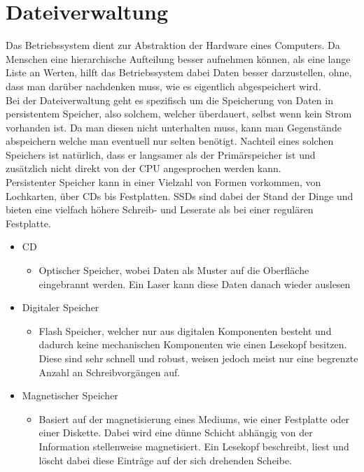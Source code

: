 \documentclass{article}
\begin{document}
	\section{Dateiverwaltung}
	Das Betriebssystem dient zur Abstraktion der Hardware eines Computers. Da Menschen eine hierarchische Aufteilung besser aufnehmen können, als eine lange Liste an Werten, hilft das Betriebssystem dabei Daten besser darzustellen, ohne, dass man darüber nachdenken muss, wie es eigentlich abgespeichert wird. \\
	Bei der Dateiverwaltung geht es spezifisch um die Speicherung von Daten in persistentem Speicher, also solchem, welcher überdauert, selbst wenn kein Strom vorhanden ist. Da man diesen nicht unterhalten muss, kann man Gegenstände abspeichern welche man eventuell nur selten benötigt. Nachteil eines solchen Speichers ist natürlich, dass er langsamer als der Primärspeicher ist und zusätzlich nicht direkt von der CPU angesprochen werden kann. \\
	Persistenter Speicher kann in einer Vielzahl von Formen vorkommen, von Lochkarten, über CDs bis Festplatten. SSDs sind dabei der Stand der Dinge und bieten eine vielfach höhere Schreib- und Leserate als bei einer regulären Festplatte. \\
	\begin{itemize}
		\item{CD}
		\begin{itemize}
			\item{Optischer Speicher, wobei Daten als Muster auf die Oberfläche eingebrannt werden. Ein Laser kann diese Daten danach wieder auslesen}
		\end{itemize}
		\item{Digitaler Speicher}
		\begin{itemize}
			\item{Flash Speicher, welcher nur aus digitalen Komponenten besteht und dadurch keine mechanischen Komponenten wie einen Lesekopf besitzen. Diese sind sehr schnell und robust, weisen jedoch meist nur eine begrenzte Anzahl an Schreibvorgängen auf.}
		\end{itemize}
		\item{Magnetischer Speicher}
		\begin{itemize}
			\item{Basiert auf der magnetisierung eines Mediums, wie einer Festplatte oder einer Diskette. Dabei wird eine dünne Schicht abhängig von der Information stellenweise magnetisiert. Ein Lesekopf beschreibt, liest und löscht dabei diese Einträge auf der sich drehenden Scheibe.}
		\end{itemize}
	\end{itemize}
\end{document}
